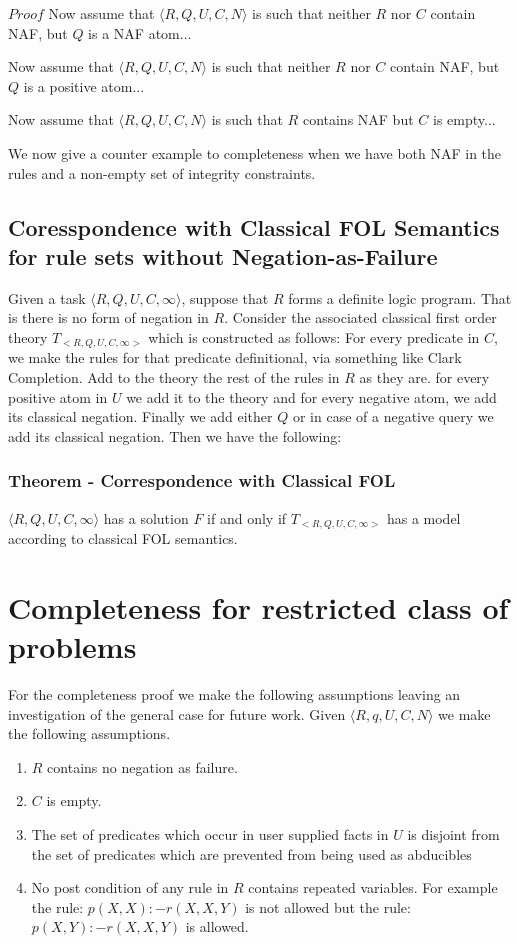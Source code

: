 $Proof$ Now assume that $\langle R,Q,U,C,N\rangle$ is such that neither $R$ nor $C$ contain NAF, but $Q$ is a NAF atom...

Now assume that $\langle R,Q,U,C,N\rangle$ is such that neither $R$ nor $C$ contain NAF, but $Q$ is a positive atom...

Now assume that $\langle R,Q,U,C,N\rangle$ is such that $R$ contains NAF but $C$ is empty...

We now give a counter example to completeness when we have both NAF in the rules and a non-empty set of integrity constraints.

\subsection{Coresspondence with Classical FOL Semantics for rule sets without Negation-as-Failure}

Given a task $\langle R,Q,U,C,\infty\rangle$, suppose that $R$ forms a definite logic
program. That is there is no form of negation in $R$. Consider the associated
classical first order theory $T_{<R,Q,U,C,\infty>}$ which is constructed as
follows: For every predicate in $C$, we make the rules for that predicate
definitional, via something like Clark Completion. Add to the theory the rest
of the rules in $R$ as they are. for every positive atom in $U$ we add it to
the theory and for every negative atom, we add its classical negation. Finally
we add either $Q$ or in case of a negative query we add its classical
negation. Then we have the following:

\subsubsection{Theorem - Correspondence with Classical FOL}
$\langle R,Q,U,C,\infty\rangle$ has a solution $F$ if and only if $T_{<R,Q,U,C,\infty>}$ has a model according to classical FOL semantics.


\section{Completeness for restricted class of problems}
For the completeness proof we make the following assumptions leaving an investigation of the general case for future work. Given $\langle R,q,U,C,N\rangle$ we make the following assumptions.

\begin{enumerate}
\item $R$ contains no negation as failure.
\item $C$ is empty.
\item The set of predicates which occur in user supplied facts in $U$ is
  disjoint from the set of predicates which are prevented from being used as
  abducibles
\item No post condition of any rule in $R$ contains repeated variables. For example the rule:
$p(X,X):-r(X,X,Y)$ is not allowed but the rule: $p(X,Y):-r(X,X,Y)$ is allowed.
\end{enumerate}

